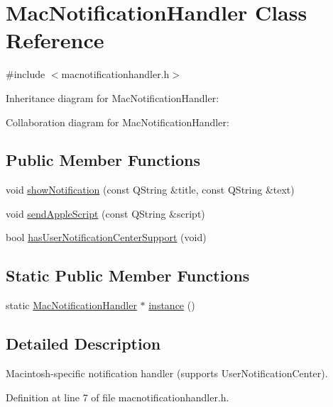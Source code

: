 \hypertarget{class_mac_notification_handler}{}\section{Mac\+Notification\+Handler Class Reference}
\label{class_mac_notification_handler}


{\ttfamily \#include $<$macnotificationhandler.\+h$>$}



Inheritance diagram for Mac\+Notification\+Handler\+:


Collaboration diagram for Mac\+Notification\+Handler\+:
\subsection*{Public Member Functions}
\begin{DoxyCompactItemize}
\item 
void \hyperlink{class_mac_notification_handler_abeb9b3a7c81397499fbb7e1d24610cd9}{show\+Notification} (const Q\+String \&title, const Q\+String \&text)
\item 
void \hyperlink{class_mac_notification_handler_a39051c00850f7b6cb644cdb60006dc2e}{send\+Apple\+Script} (const Q\+String \&script)
\item 
bool \hyperlink{class_mac_notification_handler_a132cba3b7df82afd3b07ca08599b94a5}{has\+User\+Notification\+Center\+Support} (void)
\end{DoxyCompactItemize}
\subsection*{Static Public Member Functions}
\begin{DoxyCompactItemize}
\item 
static \hyperlink{class_mac_notification_handler}{Mac\+Notification\+Handler} $\ast$ \hyperlink{class_mac_notification_handler_a8ba83adcb63db47e3f7a76a0afc02b9d}{instance} ()
\end{DoxyCompactItemize}


\subsection{Detailed Description}
Macintosh-\/specific notification handler (supports User\+Notification\+Center). 

Definition at line 7 of file macnotificationhandler.\+h.



